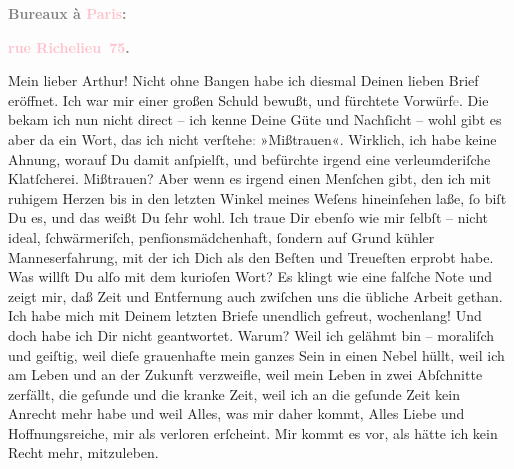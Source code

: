            \pstart
           \begin{otherlanguage}{french}\textcolor{gray}{\textbf{\textbf{Bureaux à \textcolor{pink}{Paris}{}\ledrightnote{\textcolor{pink}{Paris}}:}}}\end{otherlanguage}\pend
           \pstart
           \begin{otherlanguage}{french}\textcolor{gray}{\textbf{\textbf{\textcolor{pink}{rue Richelieu 75}{}\ledrightnote{\textcolor{pink}{rue Richelieu}}.}}}\end{otherlanguage}\pend
           \pstart\center{}Mein lieber Arthur!\pend\pstart
           Nicht ohne Bangen habe ich diesmal Deinen lieben Brief eröffnet. Ich war mir einer
               großen Schuld bewußt, und fürchtete Vorwürf\textcolor{gray}{e}. Die bekam ich nun
               nicht direct – ich kenne Deine Güte und Nachſicht – wohl gibt es aber da ein Wort,
               das ich nicht verſtehe\textcolor{gray}{:} »Mißtrauen«. Wirklich, ich habe keine
               Ahnung, worauf Du damit anſpielſt, und befürchte irgend eine verleumderiſche
               Klatſcherei. Mißtrauen? Aber wenn es irgend einen Menſchen gibt, den ich mit ruhigem
               Herzen bis in den letzten Winkel meines Weſens hineinſehen laße, ſo {\pb}biſt Du es, und das weißt Du ſehr wohl. Ich traue
               Dir ebenſo wie mir ſelbſt – nicht ideal, ſchwärmeriſch, penſionsmädchenhaft, ſondern
               auf Grund kühler Manneserfahrung, mit der ich Dich als den Beſten und Treueſten
               erprobt habe. Was willſt Du alſo mit dem kurioſen Wort? Es klingt wie eine falſche
               Note und zeigt mir, daß Zeit und Entfernung auch zwiſchen uns die übliche Arbeit
               gethan.\pend
           \pstart
           Ich habe mich mit Deinem letzten Briefe unendlich gefreut, wochenlang! Und doch habe
               ich Dir nicht geantwortet. Warum? Weil ich gelähmt bin – moraliſch und geiſtig, weil
                  dieſe grauenhafte \label{K_L02711-1v}\label{K_L02711-1h} mein ganzes Sein in einen Nebel hüllt, weil ich am Leben und an der Zukunft
               verzweifle, weil mein Leben {\pb}in zwei Abſchnitte
               zerfällt, die geſunde und die kranke Zeit, weil ich an die geſunde Zeit kein Anrecht
               mehr habe und weil Alles, was mir daher kommt, Alles Liebe und Hoffnungsreiche, mir
               als verloren erſcheint. Mir kommt es vor, als hätte ich kein Recht mehr, mitzuleben.
